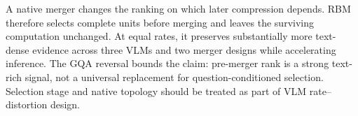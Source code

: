 \documentclass[smallabstract,smallcaptions]{dccpaper}
\begin{document}

A native merger changes the ranking on which later compression depends. RBM
therefore selects complete units before merging and leaves the surviving
computation unchanged. At equal rates, it preserves substantially more
text-dense evidence across three VLMs and two merger designs while accelerating
inference. The GQA reversal bounds the claim: pre-merger rank is a strong
text-rich signal, not a universal replacement for question-conditioned
selection. Selection stage and native topology should be treated as part of
VLM rate--distortion design.



\end{document}
